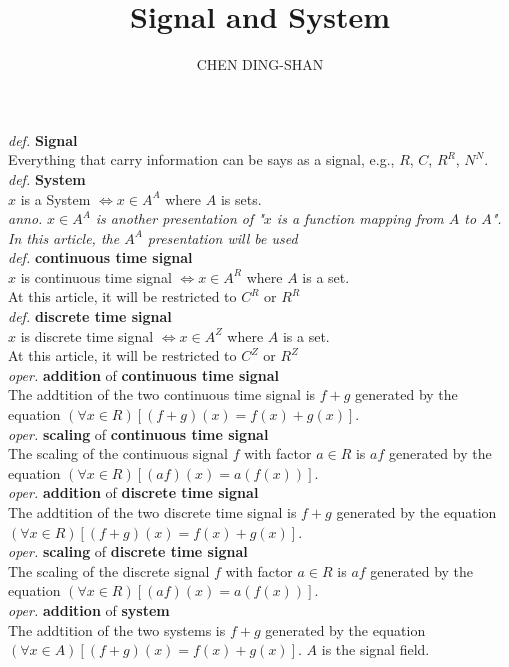\documentclass{article}
\title{Signal and System}
\author{CHEN DING-SHAN}
\date{}
\newcommand{\sd}[1]{{\left(#1\right)}}
\newcommand{\df}[1]{\emph{def.} \textbf{#1}}
\newcommand{\anno}[1]{\emph{anno.} \emph{#1}}
\newcommand{\md}[1]{{\left[#1\right]}}
\newcommand{\oper}[2]{\emph{oper.} \textbf{#1} of \textbf{#2}}
\begin{document}
\maketitle
\noindent
\df{Signal}\\
Everything that carry information can be says as a signal, e.g., $R$, $C$, $R^R$, $N^N$.\\
\df{System}\\
$x$ is a System $\iff x \in A^A$ where $A$ is sets.\\
\anno{$x \in A^A$ is another presentation of "$x$ is a function mapping from $A$ to $A$". In this article, the $A^A$ presentation will be used}\\
\df{continuous time signal}\\
$x$ is continuous time signal $\iff x \in A^R$ where $A$ is a set.\\
At this article, it will be restricted to $C^R$ or $R^R$\\
\df{discrete time signal}\\
$x$ is discrete time signal $\iff x \in A^Z$ where $A$ is a set.\\
At this article, it will be restricted to $C^Z$ or $R^Z$\\
\oper{addition}{continuous time signal}\\
The addtition of the two continuous time signal is $f+g$ generated by the equation $\sd{\forall x \in R}\md{\sd{f+g}\sd{x} = f\sd{x} + g\sd{x}}$.\\
\oper{scaling}{continuous time signal}\\
The scaling of the continuous signal $f$ with factor $a \in R$ is $af$ generated by the equation $\sd{\forall x \in R}\md{\sd{af}\sd{x} = a\sd{f\sd{x}}}$.\\
\oper{addition}{discrete time signal}\\
The addtition of the two discrete time signal is $f+g$ generated by the equation $\sd{\forall x \in R}\md{\sd{f+g}\sd{x} = f\sd{x} + g\sd{x}}$.\\
\oper{scaling}{discrete time signal}\\
The scaling of the discrete signal $f$ with factor $a \in R$ is $af$ generated by the equation $\sd{\forall x \in R}\md{\sd{af}\sd{x} = a\sd{f\sd{x}}}$.\\
\oper{addition}{system}\\
The addtition of the two systems is $f+g$ generated by the equation $\sd{\forall x \in A}\md{\sd{f+g}\sd{x} = f\sd{x} + g\sd{x}}$. $A$ is the signal field.\\
\end{document}
